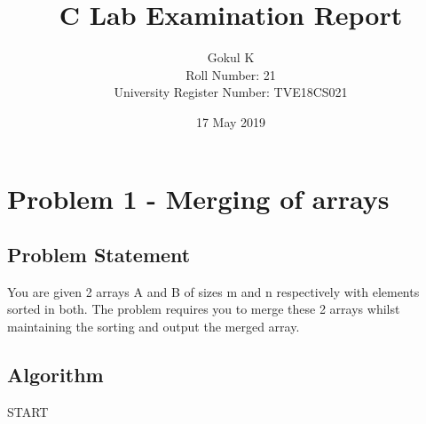 \documentclass{article}
\title{C Lab Examination Report}
\author{Gokul K\\[2\baselineskip]
Roll Number: 21\\[2\baselineskip]
University Register Number: TVE18CS021}
\date{17 May 2019}
\begin{document}
\newpage
\maketitle

\section{Problem 1 - Merging of arrays}
\subsection{Problem Statement}
You are given 2 arrays A and B of sizes m and n respectively with elements sorted in both. The problem requires you to merge these 2 arrays whilst maintaining the sorting and output the merged array.

\subsection{Algorithm}
START
\end{document}
